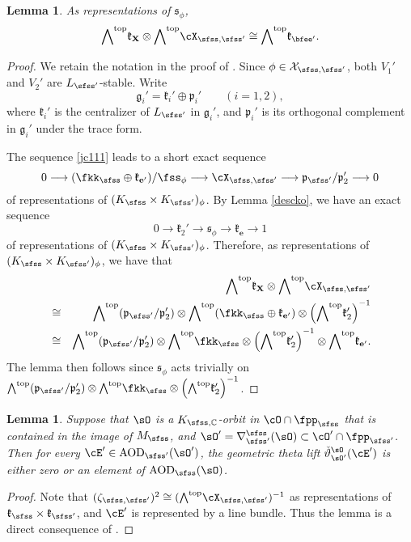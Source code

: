 \documentclass[12pt,a4paper]{amsart}
\newcommand{\CX}{{\mathcal {X}}}
\newcommand{\g}{\mathfrak g}
\newcommand{\p}{\mathfrak p}
\newcommand{\X}{\mathbf{X}}
\numberwithin{equation}{section}
\newtheorem{lem}[thm]{Lemma}
\theoremstyle{remark}
\def\cOp{\cO^{\prime}}
\begin{document}
\begin{lem}\label{lem:tan}
 As representations of  $\mathfrak s_\phi$, 
  \begin{equation}\label{eq:aod}
    \wedgetop \mathfrak k_{\X} \otimes \wedgetop \CXss  \cong \wedgetop \mathfrak k_{\Xp}.
  \end{equation}
\end{lem}
\begin{proof}
  We retain the notation in the proof of . Since $\phi\in \CX_{\sfss, \sfss'}$, both $V_1'$ and $V_2'$ are $L_{\sfss'}$-stable.  Write
  \[
    \g_i'=\mathfrak k_i'\oplus \p_i'\qquad (i=1,2),
  \]
  where $\mathfrak k_i'$ is the centralizer of $L_{\sfss'}$ in $\g_i'$, and $\p_i'$ is its orthogonal complement in $\g_i'$ under the trace form. 

   The sequence \eqref{jc111} leads to a short exact sequence
  \[
    0\longrightarrow (\fkks\oplus \mathfrak k_{\mathbf e'})/ \fss_{\ww}
    \longrightarrow \CXss \longrightarrow \p_{\sfss'}/\p_2'  \longrightarrow 0
  \]
  of representations of $(\Ks\times \Ksp)_{\ww}$. 
By 
Lemma \ref{descko}, we have an exact sequence 
\[
  0\rightarrow \mathfrak k_2'\rightarrow \mathfrak s_\phi\rightarrow \mathfrak k_{\mathbf e}\rightarrow 1
\]
of representations of $(\Ks\times \Ksp)_{\ww}$. Therefore, as  representations of $(\Ks\times \Ksp)_{\ww}$, we have that
\begin{eqnarray*}
      &&\wedgetop \mathfrak k_{\X} \otimes \wedgetop \CXss\\
      & \cong & \wedgetop (\p_{\sfss'}/\p_2')  \otimes \wedgetop (\fkks\oplus \mathfrak k_{\mathbf e'}) \otimes
      \left(\wedgetop \mathfrak k_2'\right)^{-1}\\
       & \cong & \wedgetop (\p_{\sfss'}/\p_2')  \otimes  \wedgetop \fkks \otimes
      \left(\wedgetop \mathfrak k_2'\right)^{-1}\otimes \wedgetop  \mathfrak k_{\mathbf e'}. \\
\end{eqnarray*}
The lemma then follows since $\mathfrak s_\phi$ acts trivially on $ \wedgetop (\p_{\sfss'}/\p_2')  \otimes  \wedgetop \fkks \otimes
      \left(\wedgetop \mathfrak k_2'\right)^{-1}$. 
      
      \end{proof}



\begin{lem}\label{lem:aod}
  Suppose that $\sO$ is a $K_{\sfss,\C}$-orbit in $\cO\cap \fpps$ that is contained in the image of $M_\sfss$,  and
  $\sOp = \DDss(\sO)\subset \cOp\cap \fppsp$.
  Then for every $\cE' \in \AOD_{\sfss'}(\sOp)$, 
   the geometric theta lift $\dlift_{\sO'}^{\sO}(\cE')$ is either zero or an element of  $\AOD_{\sfss}(\sO)$.
\end{lem}
\begin{proof}
  Note that $(\zeta_{\sfss,\sfss'})^{2} \cong (\wedgetop \CXss)^{-1}$ as representations of $\mathfrak k_\sfss\times \mathfrak k_{\sfss'}$, and $\cE'$ is represented by a line bundle. Thus  
   the lemma is a direct consequence of  .
\end{proof}
\end{document}
